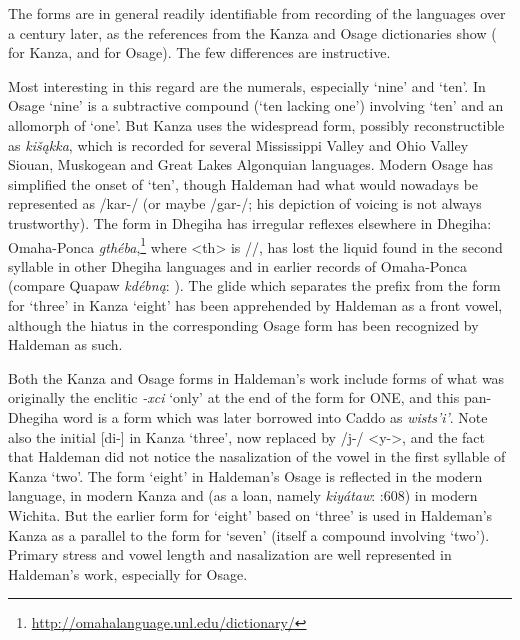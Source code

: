 \documentclass[output=paper]{LSP/langsci}
\begin{document}
The forms are in general readily identifiable from recording of the languages over a century later, as the references from the Kanza and Osage dictionaries show (\citealt{CumberlandRankin2012} for Kanza, and \citealt{Quintero2009} for Osage). The few differences are instructive.    

Most interesting in this regard are the numerals, especially `nine' and `ten'.  In Osage `nine' is a subtractive compound (`ten lacking one') involving `ten' and an allomorph of `one'.  But  Kanza uses the widespread form, possibly reconstructible as \textit{ki\v{s}\k{a}kka}, which is recorded for several Mississippi Valley and Ohio Valley Siouan, Muskogean and Great Lakes Algonquian languages.   Modern Osage has simplified the onset of `ten', though Haldeman had what would nowadays be represented as /kar-/ (or maybe /gar-/; his depiction of voicing is not always trustworthy).  The form in Dhegiha has irregular reflexes elsewhere in Dhegiha:   Omaha-Ponca \textit{gth\'eba},\footnote{\url{http://omahalanguage.unl.edu/dictionary/}} where <th> is //, has lost the liquid found in the second syllable in other Dhegiha languages and in earlier records of Omaha-Ponca (compare Quapaw \textit{kd\'ebn\k{a}}: \citealt[3]{Rankin1982}). The glide which separates the prefix from the form for `three' in Kanza `eight' has been apprehended by Haldeman as a front vowel, although the hiatus in the corresponding Osage form has been recognized by Haldeman as such.  

Both the Kanza and Osage forms in Haldeman's work include forms of what was originally the enclitic \textit{-xci} `only' at the end of the form for ONE, and this pan-Dhegiha word is a form which was later borrowed into Caddo as \textit{wists'i'}.  Note also the initial [di-] in Kanza `three', now replaced by /j-/ <y->, and the fact that Haldeman did not notice the nasalization of the vowel in the first syllable of Kanza `two'.  The form `eight' in Haldeman's Osage is reflected in the modern language, in modern Kanza and (as a loan, namely \textit{kiy\'ataw}: \citealt{Rood1996}:608) in modern Wichita. But the earlier form for `eight' based on `three' is used in Haldeman's Kanza as a parallel to the form for `seven' (itself a compound involving `two'). Primary stress and vowel length and nasalization are well represented in Haldeman's work, especially for Osage.  
\end{document}
